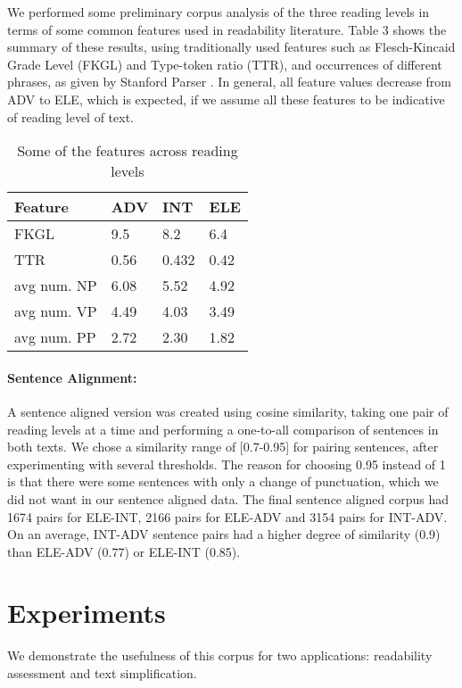 \documentclass[11pt,a4paper]{article}
\begin{document}
We performed some preliminary corpus analysis of the three reading levels in terms of some common features used in readability literature. Table 3 shows the summary of these results, using traditionally used features such as Flesch-Kincaid Grade Level (FKGL) \cite{Kincaid.Fishburne.ea-75} and Type-token ratio (TTR), and occurrences of different phrases, as given by Stanford Parser \cite{Chen.Manning-14}. In general, all feature values decrease from ADV to ELE, which is expected, if we assume all these features to be indicative of reading level of text. 
\begin{table}[h!]
\begin{tabular}{| l| l|l | l|}
\hline
\textbf{Feature}&\textbf{ADV}&\textbf{INT}& \textbf{ELE}\\ \hline
FKGL & 9.5 & 8.2 & 6.4 \\
TTR & 0.56 & 0.432 & 0.42 \\
avg num. NP&6.08&5.52&4.92\\
avg num. VP&4.49&4.03&3.49\\
avg num. PP&2.72&2.30&1.82\\ \hline
\end{tabular}
\label{tab:desc2}
\caption{Some of the features across reading levels}
\end{table}

\paragraph{Sentence Alignment:} A sentence aligned version was created using cosine similarity, taking one pair of reading levels at a time and performing a one-to-all comparison of sentences in both texts. We chose a similarity range of [0.7-0.95] for pairing sentences, after experimenting with several thresholds. The reason for choosing 0.95 instead of 1 is that there were some sentences with only a change of punctuation, which we did not want in our sentence aligned data. The final sentence aligned corpus had 1674 pairs for ELE-INT, 2166 pairs for ELE-ADV and 3154 pairs for INT-ADV.  On an average, INT-ADV sentence pairs had a higher degree of similarity (0.9) than ELE-ADV (0.77) or ELE-INT (0.85). 

\section{Experiments}
\label{sec:expts}
We demonstrate the usefulness of this corpus for two applications: readability assessment and text simplification. 
\end{document}
